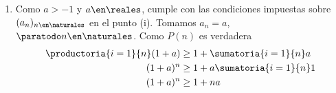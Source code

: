 \begin{enumerate}[label=\roman*)]
  \item Como $a > -1$ y $a \en \reales $, cumple con las condiciones impuestas sobre $(a_n)_{n \en \naturales }$ en el
        punto (i). Tomamos $a_n = a$, $\paratodo n \en \naturales $. Como $P(n)$ es verdadera
        \begin{align*}
          \productoria{i=1}{n}  (1 + a) & \geq 1 + \sumatoria{i=1}{n} a   \\
          (1 + a)^n                     & \geq 1 + a \sumatoria{i=1}{n} 1 \\
          (1 + a)^n                     & \geq 1 + n a
        \end{align*}
\end{enumerate}

\begin{aportes}
  \item {}
\end{aportes}
